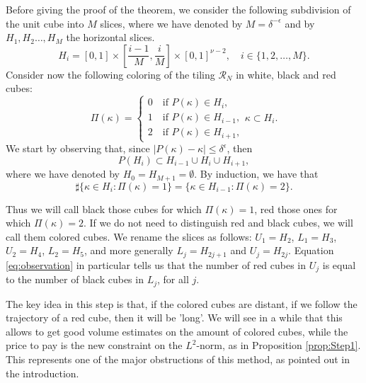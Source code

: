 \documentclass[12 pt]{article}
\theoremstyle{definition} \newtheorem{definition}{Definition}[section]
\theoremstyle{definition} \newtheorem{remark}[definition]{Remark}
\theoremstyle{plain} \newtheorem{lemma}[definition]{Lemma}
\theoremstyle{plain} \newtheorem{proposition}[definition]{Proposition}
\theoremstyle{plain} \newtheorem{theorem}[definition]{Theorem}
\theoremstyle{plain} \newtheorem{corollary}[definition]{Corollary}
\theoremstyle{definition} \newtheorem{example}[definition]{Example}
\theoremstyle{definition} \newtheorem{assumption}[definition]{Assumption}
\theoremstyle{definition} \newtheorem{conjecture}[definition]{Conjecture}
\newcommand{\1}{\mathbbm 1}
\numberwithin{equation}{section}
\begin{document}
Before giving the proof of the theorem, we consider the following subdivision of the unit cube into $M$ slices, where we have denoted by $M=\delta^{-\epsilon}$ and
by $H_1,H_2\dots, H_M$ the horizontal slices.
\begin{equation*}
    H_i=[0,1]\times\left[\frac{i-1}{M},\frac{i}{M}\right]\times[0,1]^{\nu-2}, \quad i\in\lbrace 1,2,\dots,M\rbrace.
\end{equation*} 
Consider now the following coloring of the tiling $\mathcal{R}_N$ in white, black and red cubes:
\begin{equation}\label{eq:coloring:3:colors}
    \Pi(\kappa)=\begin{cases}
        0\quad\text{if }P(\kappa)\in H_i, \\
        1 \quad\text{if }P(\kappa)\in H_{i-1}, \\
        2 \quad\text{if }P(\kappa)\in H_{i+1},
    \end{cases}\kappa\subset H_i.
\end{equation}
  We start by observing that, since $|P(\kappa)-\kappa|\leq \delta^\epsilon$, then 
\begin{equation*}
    P(H_i)\subset H_{i-1}\cup H_{i}\cup H_{i+1},
\end{equation*}
where we have denoted by $H_0=H_{M+1}=\emptyset$.
By induction, we have that
\begin{equation}\label{eq:observation}
    \sharp \lbrace \kappa\in H_i: \Pi(\kappa)=1\rbrace=\lbrace \kappa\in H_{i-1}:\Pi(\kappa)=2\rbrace.
\end{equation}

Thus we will call black those cubes for which $\Pi(\kappa)=1$, red those ones for which $\Pi(\kappa)=2$. If we do not need to distinguish red and black cubes, we will call them colored cubes. We rename the slices as follows: $U_1=H_2$, $L_1=H_3$, $U_2=H_4$, $L_2=H_5$, and more generally $L_j=H_{2j+1}$ and $U_j=H_{2j}$. Equation \eqref{eq:observation} in particular tells us that the number of red cubes in $U_j$ is equal to the number of black cubes in $L_j$, for all $j$.

\medskip



The key idea in this step is that, if the colored cubes are distant, if we follow the trajectory of a red cube, then it will be 'long'. 
    We will see in a while that this allows to get good volume estimates on the amount of colored cubes, while the price to pay is the new constraint on the $L^2$-norm, as in Proposition \ref{prop:Step1}. This represents one of the major obstructions of this method, as pointed out in the introduction.
\end{document}
